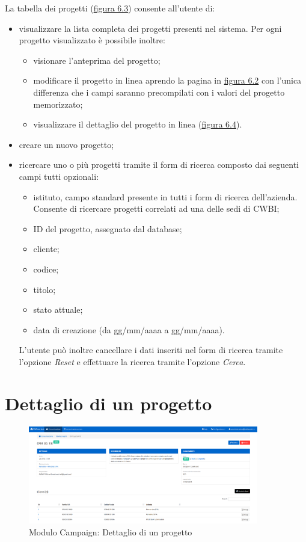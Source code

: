 \noindent La tabella dei progetti ({\hyperref[fig:tabellaProgetti]{figura 6.3}}) consente all'utente di:
\begin{itemize}
\item visualizzare la lista completa dei progetti presenti nel sistema. Per ogni progetto visualizzato è possibile inoltre: 
\begin{itemize}
\item visionare l'anteprima del progetto;
\item modificare il progetto in linea aprendo la pagina in  {\hyperref[fig:nuovoProgetto]{figura 6.2}} con l'unica differenza che i campi saranno precompilati con i valori del progetto memorizzato;
\item visualizzare il dettaglio del progetto in linea ({\hyperref[fig:dettaglioProgetto]{figura 6.4}}).
\end{itemize}

\item creare un nuovo progetto;
\item ricercare uno o più progetti tramite il form di ricerca composto dai seguenti campi tutti opzionali:
\begin{itemize}
\item istituto, campo standard presente in tutti i form di ricerca dell'azienda. Consente di ricercare progetti correlati ad una delle sedi di CWBI;
\item ID del progetto, assegnato dal database;
\item cliente;
\item codice;
\item titolo;	
\item stato attuale;
\item data di creazione (da gg/mm/aaaa a gg/mm/aaaa).
\end{itemize}
L'utente può inoltre cancellare i dati inseriti nel form di ricerca tramite l'opzione \textit{Reset} e effettuare la ricerca tramite l'opzione \textit{Cerca}.
\end{itemize}

\pagebreak

\section{Dettaglio di un progetto}
\begin{figure}[!h]
\centering
\includegraphics[width=380px]{../images/UI/04-dettaglioProgetto.png}
\caption{Modulo Campaign: Dettaglio di un progetto}
\label{fig:dettaglioProgetto}
\end{figure}

